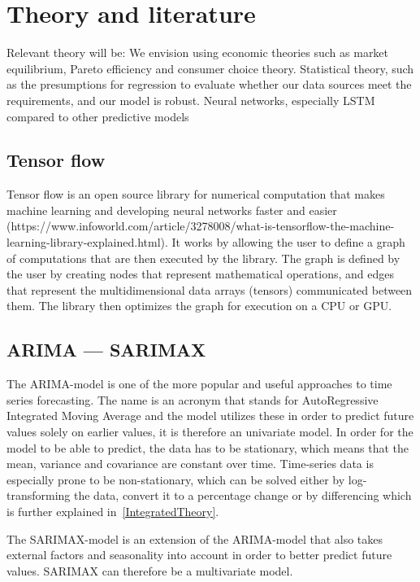 \section{Theory and literature}

Relevant theory will be: 
We envision using economic theories such as market equilibrium, Pareto efficiency and consumer choice theory. 
Statistical theory, such as the presumptions for regression to evaluate whether our data sources meet the requirements, and our model is robust. 
Neural networks, especially LSTM compared to other predictive models 

\subsection{Tensor flow}
Tensor flow is an open source library for numerical computation that makes machine learning and developing neural networks faster and easier (https://www.infoworld.com/article/3278008/what-is-tensorflow-the-machine-learning-library-explained.html).
It works by allowing the user to define a graph of computations that are then executed by the library. The graph is defined by the user by creating nodes that represent mathematical operations, and edges that represent the multidimensional data arrays (tensors) communicated between them. 
The library then optimizes the graph for execution on a CPU or GPU. 

\subsection{ARIMA --- SARIMAX}\label{ARIMATheory}

The ARIMA-model is one of the more popular and useful approaches to time series forecasting. The name is an acronym that stands for AutoRegressive Integrated Moving Average and the model utilizes these in order to predict future values solely on earlier values, it is therefore an univariate model. In order for the model to be able to predict, the data has to be stationary, which means that the mean, variance and covariance are constant over time. Time-series data is especially prone to be non-stationary, which can be solved either by log-transforming the data, convert it to a percentage change or by differencing which is further explained in~\ref{IntegratedTheory}.

The SARIMAX-model is an extension of the ARIMA-model that also takes external factors and seasonality into account in order to better predict future values. SARIMAX can therefore be a multivariate model. \parencite{hyndman_athanasopoulos_2021}

